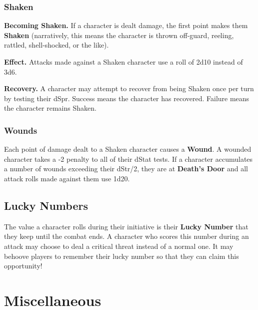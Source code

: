 \documentclass[10pt,twoside,twocolumn,openany]{book}
\begin{document}
\subsubsection{Shaken}
\textbf{Becoming Shaken.} If a character is dealt damage, the first point makes them \textbf{Shaken} (narratively, this means the character is thrown off-guard, reeling, rattled, shell-shocked, or the like).

\textbf{Effect.} Attacks made against a Shaken character use a roll of 2d10 instead of 3d6.

\textbf{Recovery.} A character may attempt to recover from being Shaken once per turn by testing their dSpr. Success means the character has recovered. Failure means the character remains Shaken.

\subsubsection{Wounds}
Each point of damage dealt to a Shaken character causes a \textbf{Wound}. A wounded character takes a -2 penalty to all of their dStat tests. If a character accumulates a number of wounds exceeding their dStr/2, they are at \textbf{Death's Door} and all attack rolls made against them use 1d20.

\subsection{Lucky Numbers}
The value a character rolls during their initiative is their \textbf{Lucky Number} that they keep until the combat ends. A character who scores this number during an attack may choose to deal a critical threat instead of a normal one. It may behoove players to remember their lucky number so that they can claim this opportunity!

\section{Miscellaneous}
\end{document}
